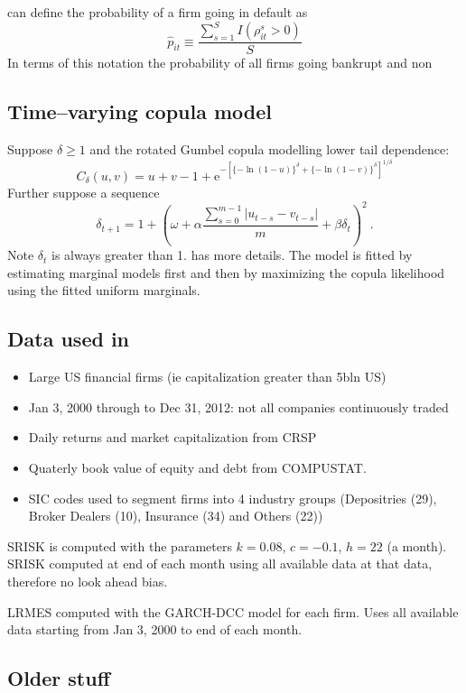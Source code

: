 \documentclass[authoryear]{elsarticle}
\newcommand{\e}{\mathrm{e}}
\begin{document}
 can define the probability of a firm going in default as
$$
\hat p_{it}\equiv \frac{\sum_{s=1}^SI(\rho_{it}^s>0)}{S}
$$ 
In terms of this notation the probability of all firms going bankrupt and non



\subsection{Time--varying copula model}

Suppose $\delta\ge 1$ and the rotated Gumbel copula modelling lower tail dependence:
$$
C_\delta(u,v) = u+v-1+\e^{-[\{-\ln(1-u)\}^{\delta}+\{-\ln(1-v)\}^{\delta}]^{1/\delta}}
$$
Further suppose a sequence
$$
\delta_{t+1} = 1+\left(\omega + \alpha \frac{\sum_{s=0}^{m-1}|u_{t-s}-v_{t-s}|}{m}+ \beta\delta_t\right)^2\ .
$$
Note $\delta_t$ is always greater than 1.  \cite{patton2006modelling} has more details.   The model is fitted by estimating marginal models first and then by maximizing the copula likelihood using the fitted uniform marginals.

\subsection{Data  used in \cite{brownlees2015} }

\begin{itemize}
\item Large US financial firms (ie capitalization greater than 5bln US)
\item Jan 3, 2000 through to Dec 31, 2012:  not all companies continuously traded
\item Daily returns and market capitalization from CRSP
\item Quaterly book value of equity and debt from COMPUSTAT.
\item SIC codes used to segment firms into 4 industry groups (Depositries (29), Broker Dealers (10), Insurance (34) and Others (22))
\end{itemize}

SRISK is computed with the parameters $k=0.08$, $c=-0.1$, $h=22$ (a month).  SRISK computed at end of each month using all available data at that data, therefore no look ahead bias.  

LRMES computed with the GARCH-DCC model for each firm.   Uses all available data starting from Jan 3, 2000 to end of each month.


\subsection{Older stuff}
   
\end{document}
